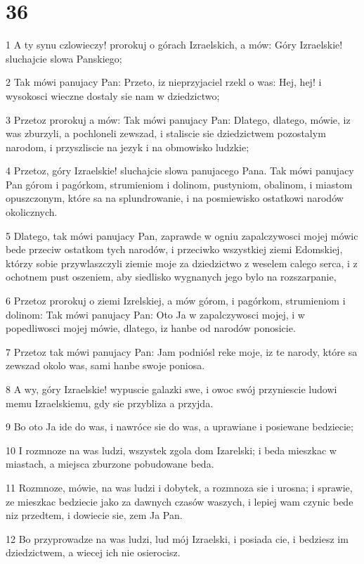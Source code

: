 \chapter{36}

\par 1 A ty synu czlowieczy! prorokuj o górach Izraelskich, a mów: Góry Izraelskie! sluchajcie slowa Panskiego;
\par 2 Tak mówi panujacy Pan: Przeto, iz nieprzyjaciel rzekl o was: Hej, hej! i wysokosci wieczne dostaly sie nam w dziedzictwo;
\par 3 Przetoz prorokuj a mów: Tak mówi panujacy Pan: Dlatego, dlatego, mówie, iz was zburzyli, a pochloneli zewszad, i staliscie sie dziedzictwem pozostalym narodom, i przyszliscie na jezyk i na obmowisko ludzkie;
\par 4 Przetoz, góry Izraelskie! sluchajcie slowa panujacego Pana. Tak mówi panujacy Pan górom i pagórkom, strumieniom i dolinom, pustyniom, obalinom, i miastom opuszczonym, które sa na splundrowanie, i na posmiewisko ostatkowi narodów okolicznych.
\par 5 Dlatego, tak mówi panujacy Pan, zaprawde w ogniu zapalczywosci mojej mówic bede przeciw ostatkom tych narodów, i przeciwko wszystkiej ziemi Edomskiej, którzy sobie przywlaszczyli ziemie moje za dziedzictwo z weselem calego serca, i z ochotnem pust oszeniem, aby siedlisko wygnanych jego bylo na rozszarpanie,
\par 6 Przetoz prorokuj o ziemi Izrelskiej, a mów górom, i pagórkom, strumieniom i dolinom: Tak mówi panujacy Pan: Oto Ja w zapalczywosci mojej, i w popedliwosci mojej mówie, dlatego, iz hanbe od narodów ponosicie.
\par 7 Przetoz tak mówi panujacy Pan: Jam podniósl reke moje, iz te narody, które sa zewszad okolo was, sami hanbe swoje poniosa.
\par 8 A wy, góry Izraelskie! wypuscie galazki swe, i owoc swój przyniescie ludowi memu Izraelskiemu, gdy sie przybliza a przyjda.
\par 9 Bo oto Ja ide do was, i nawróce sie do was, a uprawiane i posiewane bedziecie;
\par 10 I rozmnoze na was ludzi, wszystek zgola dom Izarelski; i beda mieszkac w miastach, a miejsca zburzone pobudowane beda.
\par 11 Rozmnoze, mówie, na was ludzi i dobytek, a rozmnoza sie i urosna; i sprawie, ze mieszkac bedziecie jako za dawnych czasów waszych, i lepiej wam czynic bede niz przedtem, i dowiecie sie, zem Ja Pan.
\par 12 Bo przyprowadze na was ludzi, lud mój Izraelski, i posiada cie, i bedziesz im dziedzictwem, a wiecej ich nie osierocisz.

